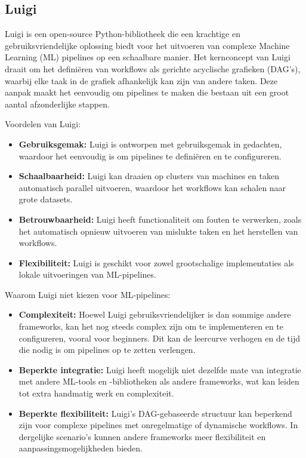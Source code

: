 \subsection{Luigi}

Luigi is een open-source Python-bibliotheek die een krachtige en gebruiksvriendelijke oplossing biedt voor het uitvoeren van complexe Machine Learning (ML) pipelines op een schaalbare manier. Het kernconcept van Luigi draait om het definiëren van workflows als gerichte acyclische grafieken (DAG's), waarbij elke taak in de grafiek afhankelijk kan zijn van andere taken. Deze aanpak maakt het eenvoudig om pipelines te maken die bestaan uit een groot aantal afzonderlijke stappen.

Voordelen van Luigi:
\begin{itemize}
  \item \textbf{Gebruiksgemak:} Luigi is ontworpen met gebruiksgemak in gedachten, waardoor het eenvoudig is om pipelines te definiëren en te configureren.
  \item \textbf{Schaalbaarheid:} Luigi kan draaien op clusters van machines en taken automatisch parallel uitvoeren, waardoor het workflows kan schalen naar grote datasets.
  \item \textbf{Betrouwbaarheid:} Luigi heeft functionaliteit om fouten te verwerken, zoals het automatisch opnieuw uitvoeren van mislukte taken en het herstellen van workflows.
  \item \textbf{Flexibiliteit:} Luigi is geschikt voor zowel grootschalige implementaties als lokale uitvoeringen van ML-pipelines.
\end{itemize}

Waarom Luigi niet kiezen voor ML-pipelines:
\begin{itemize}
    \item \textbf{Complexiteit:} Hoewel Luigi gebruiksvriendelijker is dan sommige andere frameworks, kan het nog steeds complex zijn om te implementeren en te configureren, vooral voor beginners. Dit kan de leercurve verhogen en de tijd die nodig is om pipelines op te zetten verlengen.
    \item \textbf{Beperkte integratie:} Luigi heeft mogelijk niet dezelfde mate van integratie met andere ML-tools en -bibliotheken als andere frameworks, wat kan leiden tot extra handmatig werk en complexiteit.
    \item \textbf{Beperkte flexibiliteit:} Luigi's DAG-gebaseerde structuur kan beperkend zijn voor complexe pipelines met onregelmatige of dynamische workflows. In dergelijke scenario's kunnen andere frameworks meer flexibiliteit en aanpassingsmogelijkheden bieden.
  \end{itemize}

